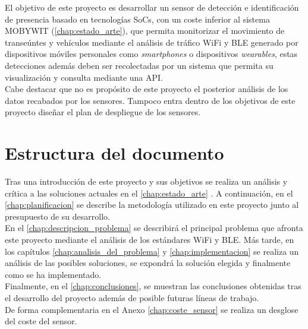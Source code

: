 \documentclass[../proyecto.tex]{subfiles}
\begin{document}
El objetivo de este proyecto es desarrollar un sensor de detección e identificación de presencia basado en tecnologías SoCs, con un coste inferior al sistema MOBYWIT (\autoref{chap:estado_arte}), que permita monitorizar el movimiento de transeúntes y vehículos mediante el análisis de tráfico WiFi y BLE generado por dispositivos móviles personales como \textit{smartphones} o dispositivos \textit{wearables}, estas detecciones además deben ser recolectadas por un sistema que permita su visualización y consulta mediante una API.\\

Cabe destacar que no es propósito de este proyecto el posterior análisis de los datos recabados por los sensores. Tampoco entra dentro de los objetivos de este proyecto diseñar el plan de despliegue de los sensores.\\

\section{Estructura del documento}

 Tras una introducción de este proyecto y sus objetivos se realiza un análisis y crítica a las soluciones actuales en el \autoref{chap:estado_arte} . A continuación, en el \autoref{chap:planificacion} se describe la metodología utilizado en este proyecto junto al presupuesto de su desarrollo.\\

En el \autoref{chap:descripcion_problema} se describirá el principal problema que afronta este proyecto mediante el análisis de los estándares WiFi y BLE. Más tarde, en los capítulos \autoref{chap:analisis_del_problema} y \autoref{chap:implementacion} se realiza un análisis de las posibles soluciones, se expondrá la solución elegida y finalmente como se ha implementado.\\

Finalmente, en el \autoref{chap:conclusiones}, se muestran las conclusiones obtenidas tras el desarrollo del proyecto además de posible futuras líneas de trabajo.\\

De forma complementaria en el Anexo \ref{chap:coste_sensor} se realiza un desglose del coste del sensor.\\
\end{document}
